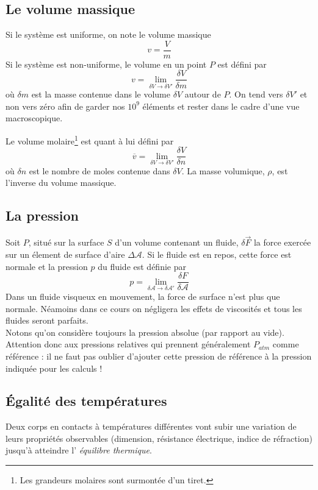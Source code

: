 	
\subsection{Le volume massique}
Si le système est uniforme, on note le volume massique 
\begin{equation}
	v = \frac{V}{m}
\end{equation}
Si le système est non-uniforme, le volume en un point $P$ est défini 
par
\begin{equation}
	v = \lim\limits_{\delta V \rightarrow \delta V'} \frac{\delta V}{
		\delta m}
\end{equation}
où $\delta m$ est la masse contenue dans le volume $\delta V$ autour 
de $P$. On tend vers $\delta V'$ et non vers zéro afin de garder nos 
$10^9$ éléments et rester dans le cadre d'une vue macroscopique.
	
Le volume molaire\footnote{Les grandeurs molaires sont surmontée d'un 
tiret.} est quant à lui défini par
\begin{equation}
	\overline{v} = \lim\limits_{\delta V \rightarrow \delta V'} \frac{
		\delta V}{\delta n}
\end{equation}
où $\delta n$ est le nombre de moles contenue dans $\delta V$. La 
masse volumique, $\rho$, est l'inverse du volume massique.
	
	
\subsection{La pression}
Soit $P$, situé sur la surface $S$ d'un volume contenant un fluide, 
$\delta \vec F$ la force exercée sur un élement de surface d'aire 
$\Delta \mathcal{A}$. Si le fluide est en repos, cette force est 
normale et la pression $p$ du fluide est définie par
\begin{equation}
	p = \lim\limits_{\delta\mathcal{A}\rightarrow\delta\mathcal{A}'} 
	\frac{\delta F}{\delta \mathcal{A}}
\end{equation}		
Dans un fluide visqueux en mouvement, la force de surface n'est 
plus que normale. Néamoins dans ce cours on négligera les effets 
de viscosités et tous les fluides seront parfaits.\\
Notons qu'on considère toujours la pression absolue (par rapport 
au vide). Attention donc aux pressions relatives qui prennent 
généralement $P_{atm}$ comme référence : il ne faut pas oublier 
d'ajouter cette pression de référence à la pression indiquée 
pour les calculs !
	
	
\subsection{Égalité des températures}
Deux corps en contacts à températures différentes vont subir une 
variation de leurs propriétés observables (dimension, résistance 
électrique, indice de réfraction) jusqu'à atteindre l'\textit{%
équilibre thermique}.
	
